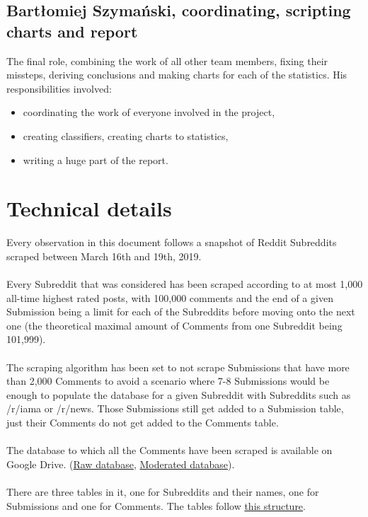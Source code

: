 \documentclass[openany]{article}
\begin{document}
\subsection{Bartłomiej Szymański, coordinating, scripting charts and report}
The final role, combining the work of all other team members, fixing their missteps, deriving conclusions and making charts for each of the statistics. His responsibilities involved:
\begin{itemize}
	\item coordinating the work of everyone involved in the project,
	\item creating classifiers, creating charts to statistics,
	\item writing a huge part of the report.
\end{itemize}

\section{Technical details}
Every observation in this document follows a snapshot of Reddit Subreddits scraped between March 16th and 19th, 2019. \\ \\
Every Subreddit that was considered has been scraped according to at most 1,000 all-time highest rated posts, with 100,000 comments and the end of a given Submission being a limit for each of the Subreddits before moving onto the next one (the theoretical maximal amount of Comments from one Subreddit being 101,999).\\ \\
The scraping algorithm has been set to not scrape Submissions that have more than 2,000 Comments to avoid a scenario where 7-8 Submissions would be enough to populate the database for a given Subreddit with Subreddits such as /r/iama or /r/news. Those Submissions still get added to a Submission table, just their Comments do not get added to the Comments table.\\ \\
The database to which all the Comments have been scraped is available on Google Drive. (\href{https://drive.google.com/file/d/1eVMN0cTHSuY3mnnkM8_UgkqlXlvftJlg/view?usp=sharing}{Raw database}, \href{https://drive.google.com/file/d/1qpjm8K_cQ629oUhFt389x_uQDdVuk-E2/view?usp=sharing}{Moderated database}). \\ \\
There are three tables in it, one for Subreddits and their names, one for Submissions and one for Comments. The tables follow \href{https://github.com/scrapingredditboys/ScrapingRedditNaturalLanguageProcessingWUT2019/blob/master/reddit-collector/tables.sql}{this structure}.\\ \\
\end{document}
